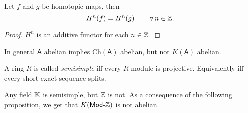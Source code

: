 \begin{cor}
	Let $f$ and $g$ be homotopic maps, then
	\begin{equation}
		H^n(f) = H^n(g) \qquad \,\forall\, n \in \mathbb{Z}
	.\end{equation} 
\end{cor} 
\begin{proof}
	$H^n$ is an additive functor for each $n \in \mathbb{Z}$.
\end{proof}

\begin{rem}[]
	In general $\mathsf{A}$ abelian implies $\mathrm{Ch}(\mathsf{A})$ abelian,
	but not $K(\mathsf{A})$ abelian.
\end{rem}

\begin{defn}
	A ring $R$ is called {\em semisimple} iff every $R$-module is projective.
	Equivalently iff every short exact sequence splits.
\end{defn}

\begin{ex}
	Any field $\mathbb{K}$ is semisimple, but $\mathbb{Z}$ is not.
	As a consequence of the following proposition, we get that $K(\mathsf{Mod}\text{-}\mathbb{Z})$
	is not abelian.
\end{ex}

